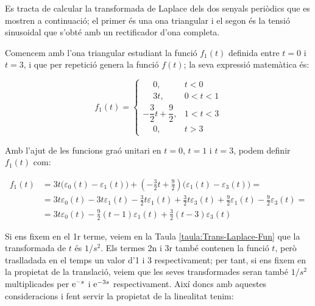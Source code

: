 \begin{exemple}
    Es tracta de calcular la transformada de Laplace dels dos
    senyals periòdics que es mostren a continuació; el primer és una
    ona triangular i el segon és la tensió sinusoidal que s'obté amb un
    rectificador d'ona completa.

    \begin{center}
        
    \end{center}

    Comencem amb l'ona triangular estudiant la funció $f_1(t)$ definida
    entre $t=0$ i $t=3$, i que per repetició genera la funció $f(t)$; la
    seva expressió matemàtica és:

    \[
        f_1(t) = \begin{cases}
        \phantom{-}0, & t < 0\\
        \phantom{-}3t, & 0<t<1 \\
        -\dfrac{3}{2}t +\dfrac{9}{2}, & 1 < t < 3 \\
        \phantom{-}0, & t > 3 \end{cases}
    \]

    Amb l'ajut de les funcions graó unitari en $t=0$, $t=1$ i $t=3$,
    podem definir $f_1(t)$ com:

    \[\begin{split}
        f_1(t) &= 3t \bigl(\varepsilon_0(t) - \varepsilon_1(t)\bigr) + \left(-\frac{3}{2}t
        +\frac{9}{2}\right) \bigl(\varepsilon_1(t) -
        \varepsilon_3(t)\bigr) = \\
        &=
        3t\varepsilon_0(t)-3t\varepsilon_1(t)-\frac{3}{2}t \varepsilon_1(t)
        +\frac{3}{2}t \varepsilon_3(t) +\frac{9}{2} \varepsilon_1(t)
        -\frac{9}{2} \varepsilon_3(t) = \\
        &=3t\varepsilon_0(t) -\frac{9}{2}(t-1)\varepsilon_1(t) +
        \frac{3}{2}(t-3)\varepsilon_3(t)
    \end{split}\]

    Si ens fixem en el 1r terme, veiem en la Taula
    \vref{taula:Trans-Laplace-Fun} que la  transformada de $t$ és $1/s^2$.
    Els termes 2n i 3r també contenen la funció $t$, però traslladada
    en el temps un valor d'1 i 3 respectivament; per tant, si ens fixem
    en la propietat de la translació, veiem que les seves transformades
    seran també $1/s^2$ multiplicades per $\mathrm{e}^{-s}$ i $\mathrm{e}^{-3s}$
    respectivament. Així doncs amb aquestes consideracions i fent
    servir la propietat de la linealitat tenim:


\end{exemple}
